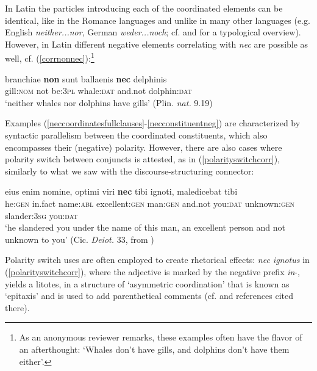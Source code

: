 \documentclass[output=paper,modfonts,nonflat,citecolor=brown,
showindex
]{langsci/langscibook}
\begin{document}
\noindent In Latin the particles introducing each of the coordinated elements can be identical, like in the Romance languages and unlike in many other languages (e.g. English {\emph{neither...nor}}, German {\emph{weder...noch}}; cf. \citealt[100--106]{BerniniRamat96} and \citealt{Haspelmath07} for a typological overview). However, in Latin different negative elements correlating with {\emph{nec}} are possible as well, cf. (\ref{corrnonnec}):{\footnote{As an anonymous reviewer remarks, these examples often have the flavor of an afterthought: `Whales don't have gills, and dolphins don't have them either'.}}

{\begin{exe}
\ex \label{corrnonnec} \gll branchiae {\textbf{non}} sunt ballaenis {\textbf{nec}} delphinis\\
gill:{\textsc{nom}} not be:{\textsc{3pl}} whale:{\textsc{dat}} and.not dolphin:{\textsc{dat}}\\

`neither whales nor dolphins have gills' (Plin. {\emph{nat.}} 9.19)
\end{exe}}

\noindent Examples (\ref{neccoordinatesfullclauses}-\ref{necconstituentneg}) are characterized by syntactic parallelism between the coordinated constituents, which also encompasses their (negative) polarity. However, there are also cases where polarity switch between conjuncts is attested, as in (\ref{polarityswitchcorr}), similarly to what we saw with the discourse-structuring connector:

{\begin{exe}
\ex \label{polarityswitchcorr} \gll eius enim nomine, optimi viri {\textbf{nec}} tibi ignoti, maledicebat tibi\\
he:{\textsc{gen}} in.fact name:{\textsc{abl}} excellent:{\textsc{gen}} man:{\textsc{gen}} and.not you:{\textsc{dat}} unknown:{\textsc{gen}} slander:{\textsc{3sg}} you:{\textsc{dat}}\\

`he slandered you under the name of this man, an excellent person and not unknown to you' (Cic. {\emph{Deiot.}} 33, from \citealt[688]{Pinkster15})
\end{exe}}

\noindent Polarity switch uses are often employed to create rhetorical effects: {\emph{nec ignotus}} in (\ref{polarityswitchcorr}), where the adjective is marked by the negative prefix {\emph{in}}-, yields a litotes, in a structure of `asymmetric coordination' that is known as `epitaxis' and is used to add parenthetical comments (cf. \citealt[]{OrlandiniPoccetti07} and references cited there).
\end{document}
